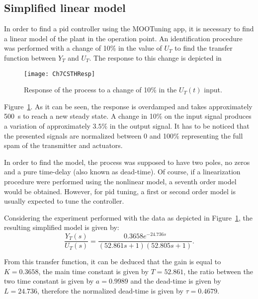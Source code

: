 \subsection{Simplified linear model}
\label{sec:SimpLinMod}
In order to find a \gls{pid} controller using the MOOTuning app, it is necessary to find a linear model of the plant in the operation point. An identification procedure was performed with a change of 10\% in the value of $U_T$ to find the transfer function between $Y_T$ and $U_T$. The response to this change is depicted in %
\begin{figure}[tb]
	\centering
	\texttt{[image: Ch7CSTHResp]}
	\caption{Response of the process to a change of 10\% in the $U_T(t)$ input.}
	\label{fig:Ch7CSTHResp}
\end{figure}
%
Figure~\ref{fig:Ch7CSTHResp}. As it can be seen, the response is overdamped and takes approximately \SI{500}{\second} to reach a new steady state. A change in 10\% on the input signal produces a variation of approximately $3.5\%$ in the output signal. It has to be noticed that the presented signals are normalized between 0 and 100\% representing the full spam of the transmitter and actuators.

In order to find the model, the process was supposed to have two poles, no zeros and a pure time-delay (also known as dead-time). Of course, if a linearization procedure were performed using the nonlinear model, a seventh order model would be obtained. However, for \gls{pid} tuning, a first or second order model is usually expected to tune the controller.

Considering the experiment performed with the data as depicted in Figure~\ref{fig:Ch7CSTHResp}, the resulting simplified model is given by:
%
\begin{equation}
\frac{Y_T(s)}{U_T(s)} = \frac{0.3658 e^{-24.736 s}}{(52.861 s+1)(52.805 s +1)}.
\label{eq:TFCSTH}
\end{equation}

From this transfer function, it can be deduced that the gain is equal to $K = 0.3658$, the main time constant is given by $T = 52.861$, the ratio between the two time constant is given by $a = 0.9989$ and the dead-time is given by $L = 24.736$, therefore the normalized dead-time is given by $\tau = 0.4679$.

